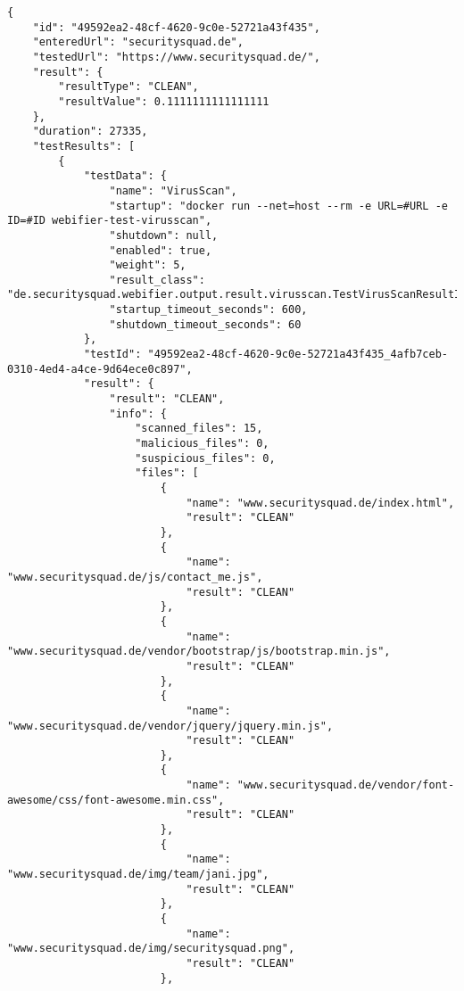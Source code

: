 \begin{scriptsize}
\begin{lstlisting}
{
    "id": "49592ea2-48cf-4620-9c0e-52721a43f435",
    "enteredUrl": "securitysquad.de",
    "testedUrl": "https://www.securitysquad.de/",
    "result": {
        "resultType": "CLEAN",
        "resultValue": 0.1111111111111111
    },
    "duration": 27335,
    "testResults": [
        {
            "testData": {
                "name": "VirusScan",
                "startup": "docker run --net=host --rm -e URL=#URL -e ID=#ID webifier-test-virusscan",
                "shutdown": null,
                "enabled": true,
                "weight": 5,
                "result_class": "de.securitysquad.webifier.output.result.virusscan.TestVirusScanResultInfo",
                "startup_timeout_seconds": 600,
                "shutdown_timeout_seconds": 60
            },
            "testId": "49592ea2-48cf-4620-9c0e-52721a43f435_4afb7ceb-0310-4ed4-a4ce-9d64ece0c897",
            "result": {
                "result": "CLEAN",
                "info": {
                    "scanned_files": 15,
                    "malicious_files": 0,
                    "suspicious_files": 0,
                    "files": [
                        {
                            "name": "www.securitysquad.de/index.html",
                            "result": "CLEAN"
                        },
                        {
                            "name": "www.securitysquad.de/js/contact_me.js",
                            "result": "CLEAN"
                        },
                        {
                            "name": "www.securitysquad.de/vendor/bootstrap/js/bootstrap.min.js",
                            "result": "CLEAN"
                        },
                        {
                            "name": "www.securitysquad.de/vendor/jquery/jquery.min.js",
                            "result": "CLEAN"
                        },
                        {
                            "name": "www.securitysquad.de/vendor/font-awesome/css/font-awesome.min.css",
                            "result": "CLEAN"
                        },
                        {
                            "name": "www.securitysquad.de/img/team/jani.jpg",
                            "result": "CLEAN"
                        },
                        {
                            "name": "www.securitysquad.de/img/securitysquad.png",
                            "result": "CLEAN"
                        },

\end{lstlisting}
\end{scriptsize}
